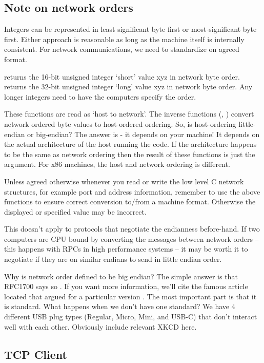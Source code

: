 \subsection{Note on network orders}

Integers can be represented in least significant byte first or most-significant byte first.
Either approach is reasonable as long as the machine itself is internally consistent.
For network communications, we need to standardize on agreed format.

 returns the 16-bit unsigned integer `short' value xyz in network byte order.
 returns the 32-bit unsigned integer `long' value xyz in network byte order.
Any longer integers need to have the computers specify the order.

These functions are read as `host to network'.
The inverse functions (, ) convert network ordered byte values to host-ordered ordering.
So, is host-ordering little-endian or big-endian?
The answer is - it depends on your machine!
It depends on the actual architecture of the host running the code.
If the architecture happens to be the same as network ordering then the result of these functions is just the argument.
For x86 machines, the host and network ordering is different.

Unless agreed otherwise whenever you read or write the low level C network structures, for example port and address information, remember to use the above functions to ensure correct conversion to/from a machine format.
Otherwise the displayed or specified value may be incorrect.

This doesn't apply to protocols that negotiate the endianness before-hand.
If two computers are CPU bound by converting the messages between network orders -- this happens with RPCs in high performance systems -- it may be worth it to negotiate if they are on similar endians to send in little endian order.

Why is network order defined to be big endian?
The simple answer is that RFC1700 says so \cite{RFC1700}.
If you want more information, we'll cite the famous article located that argued for a particular version \cite{cohen_1980}.
The most important part is that it is standard.
What happens when we don't have one standard?
We have 4 different USB plug types (Regular, Micro, Mini, and USB-C) that don't interact well with each other.
Obviously include relevant XKCD here.

\subsection{TCP Client}


